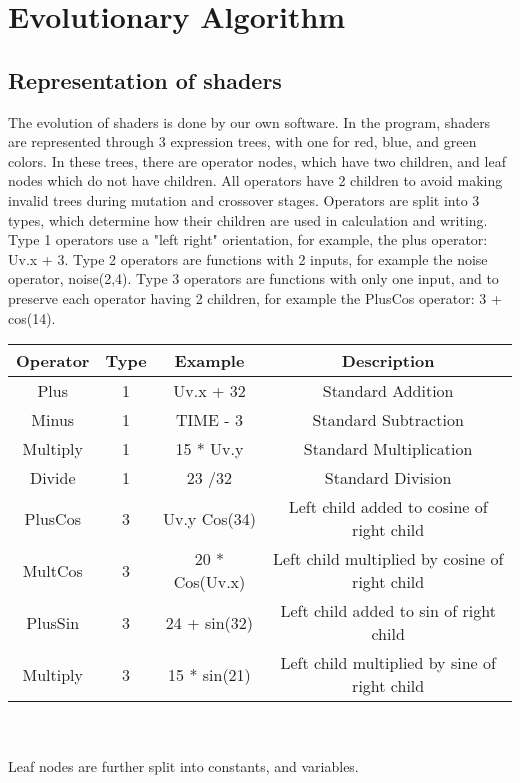 \documentclass{article}
\begin{document}
\section*{Evolutionary Algorithm}
\subsection*{Representation of shaders}
The evolution of shaders is done by our own software. In the program, shaders are represented through 3 expression trees, with one for red, blue, and green colors. In these trees, there are 
operator nodes, which have two children, and leaf nodes which do not have children. All operators have 2 children to avoid making invalid trees during mutation and crossover stages. 
Operators are split into 3 types, which determine how their children are used in calculation and writing. Type 1 operators use a "left right" orientation, for example, the plus operator: Uv.x + 3. 
Type 2 operators are functions with 2 inputs, for example the noise operator, noise(2,4). Type 3 operators are functions with only one input, and to preserve each operator having 2 children, for example the PlusCos operator: 3 + cos(14).
\\
\begin{tabular}{|c|c|c|c|}
    \hline
    Operator & Type&  Example & Description\\
    \hline
    Plus & 1 & Uv.x + 32 & Standard Addition \\
    \hline
    Minus & 1 &TIME - 3 & Standard Subtraction \\
    \hline
    Multiply & 1 & 15 * Uv.y & Standard Multiplication  \\
    \hline
    Divide & 1 & 23 /32 & Standard Division  \\
    \hline
    PlusCos & 3 & Uv.y Cos(34) & Left child added to cosine of right child  \\
    \hline
    MultCos & 3 & 20 * Cos(Uv.x) & Left child multiplied by cosine of right child  \\
    \hline
    PlusSin & 3  & 24 + sin(32) & Left child added to sin of right child  \\
    \hline
    Multiply & 3 & 15 * sin(21)& Left child multiplied by sine of right child   \\
    \hline
\end{tabular}\\\\
Leaf nodes are further split into constants, and variables. 
\\\\
\end{document}
